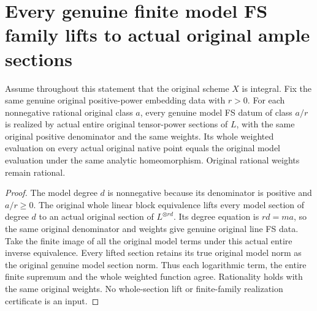 \section{Every genuine finite model FS family lifts to actual original ample sections}
\label{sec:native-ample-model-fs-realization}

\begin{theorem}
\label{thm:native-ample-model-fs-realization}
\leanok
{}
Assume throughout this statement that the original scheme $X$ is integral.
Fix the same genuine original positive-power embedding data with $r>0$.
For each nonnegative rational original class $a$, every genuine model FS datum
of class $a/r$ is realized by actual entire original tensor-power sections of
$L$, with the same original positive denominator and the same weights. Its
whole weighted evaluation on every actual original native point equals the
original model evaluation under the same analytic homeomorphism. Original
rational weights remain rational.
\end{theorem}
\begin{proof}
The model degree $d$ is nonnegative because its denominator is positive and
$a/r\ge0$. The original whole linear block equivalence lifts every model
section of degree $d$ to an actual original section of $L^{\otimes rd}$.
Its degree equation is $rd=ma$, so the same original denominator and weights
give genuine original line FS data. Take the finite image of all the original
model terms under this actual entire inverse equivalence. Every lifted section
retains its true original model norm as the original genuine model section
norm. Thus each logarithmic term, the entire finite supremum and the whole
weighted function agree. Rationality holds with the same original weights.
No whole-section lift or finite-family realization certificate is an input.
\end{proof}

